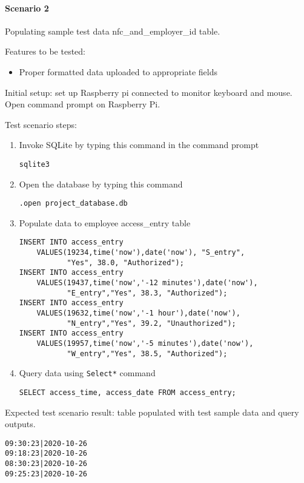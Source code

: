 \paragraph{Scenario 2}
Populating sample test data nfc\_and\_employer\_id table.

\noindent
Features to be tested:
\begin{itemize}
    \item Proper formatted data uploaded to appropriate fields
\end{itemize}

\noindent
Initial setup: set up Raspberry pi connected to monitor keyboard and mouse.
Open command prompt on Raspberry Pi.

\noindent
Test scenario steps:
\begin{enumerate}
    \item Invoke SQLite by typing this command in the command prompt
\begin{lstlisting}
sqlite3
\end{lstlisting}
    \item Open the database by typing this command 
\begin{lstlisting}
.open project_database.db
\end{lstlisting}
    \item Populate data to employee access\_entry table 
\begin{lstlisting}
INSERT INTO access_entry
    VALUES(19234,time('now'),date('now'), "S_entry",
           "Yes", 38.0, "Authorized");
INSERT INTO access_entry
    VALUES(19437,time('now','-12 minutes'),date('now'),
           "E_entry","Yes", 38.3, "Authorized");
INSERT INTO access_entry
    VALUES(19632,time('now','-1 hour'),date('now'),
           "N_entry","Yes", 39.2, "Unauthorized");
INSERT INTO access_entry
    VALUES(19957,time('now','-5 minutes'),date('now'),
           "W_entry","Yes", 38.5, "Authorized");
\end{lstlisting}
    \item Query data using \lstinline{Select*} command
\begin{lstlisting}
SELECT access_time, access_date FROM access_entry;
\end{lstlisting}
\end{enumerate}

\noindent
Expected test scenario result: table populated with test sample data and query
outputs.

\begin{lstlisting}
09:30:23|2020-10-26
09:18:23|2020-10-26
08:30:23|2020-10-26
09:25:23|2020-10-26
\end{lstlisting}

